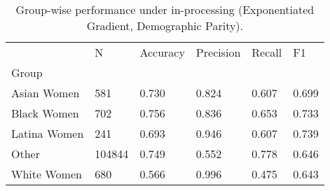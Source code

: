 \begin{table}[htbp]
\centering
\caption{Group-wise performance under in-processing (Exponentiated Gradient, Demographic Parity).}
\label{tab:11-inproc-group-metrics}
\begin{tabular}{llllll}
\toprule
 & N & Accuracy & Precision & Recall & F1 \\
Group &  &  &  &  &  \\
\midrule
Asian Women & 581 & 0.730 & 0.824 & 0.607 & 0.699 \\
Black Women & 702 & 0.756 & 0.836 & 0.653 & 0.733 \\
Latina Women & 241 & 0.693 & 0.946 & 0.607 & 0.739 \\
Other & 104844 & 0.749 & 0.552 & 0.778 & 0.646 \\
White Women & 680 & 0.566 & 0.996 & 0.475 & 0.643 \\
\bottomrule
\end{tabular}

\end{table}